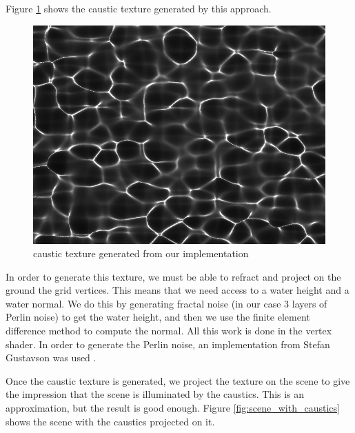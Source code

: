 \documentclass{article}
\begin{document}
Figure \ref{fig:caustics_texture} shows the caustic texture generated by this approach.

\begin{figure}[h]
 \includegraphics[width=\columnwidth]{imgs/caustics_texture.png}
 \caption{caustic texture generated from our implementation}
 \label{fig:caustics_texture}
\end{figure}

In order to generate this texture, we must be able to refract and project on the ground the grid vertices. This means that we need access to a water height and a water normal. We do this by generating fractal noise (in our case 3 layers of Perlin noise) to get the water height, and then we use the finite element difference method to compute the normal. All this work is done in the vertex shader. In order to generate the Perlin noise, an implementation from Stefan Gustavson was used \cite{perlin_noise}.

Once the caustic texture is generated, we project the texture on the scene to give the impression that the scene is illuminated by the caustics. This is an approximation, but the result is good enough. Figure \ref{fig:scene_with_caustics} shows the scene with the caustics projected on it.
\end{document}
